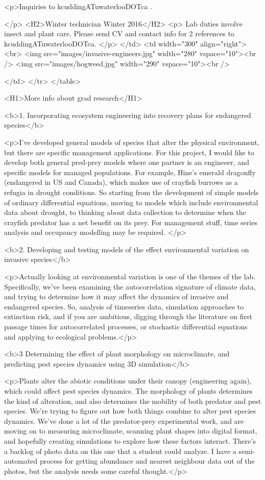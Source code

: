 <p>Inquiries to kcuddingATuwaterlooDOTca . 

  </p>
  <H2>Winter technician Winter 2016</H2> 
<p>
 Lab duties involve insect and plant care. Please send CV and contact info for 2 references to kcuddingATuwaterlooDOTca.  </p>
    </td>
    <td width="300" align="right">
<br>
	<img src="images/invasive-engineers.jpg" width="280" vspace="10"><br />
	<img src="images/hogweed.jpg" width="290" vspace="10"><br />
	
	</td>
  </tr>
</table>

<H1>More info about grad research</H1>



<b>1. Incorporating ecosystem engineering into recovery plans for endangered species</b>

<p>I've developed general models of species that alter the physical environment, but there are specific management applications. For this project, I would like to develop both general pred-prey models where one partner is an engineeer, and specific models for managed populations. For example, Hine's emerald dragonfly (endangered in US and Canada), which makes use of crayfish burrows as a refugia in drought conditions. So starting from the development of simple models of ordinary differential equations, moving to models which include environmental data about drought, to thinking about data collection to determine when the crayfish predator has a net benefit on its prey. For management stuff, time series analysis and occupancy modelling may be required. </p>

<b>2. Developing and testing models of the effect environmental variation on invasive species</b>

<p>Actually looking at environmental variation is one of the themes of the lab. Specifically, we've been examining the autocorrelation signature of climate data, and trying to determine how it may affect the dynamics of invasive and endangered species. So, analysis of timeseries data, simulation approaches to extinction risk, and if you are ambitious, digging through the literature on first passage times for autocorrelated processes, or stochastic differential equations and applying to ecological problems.</p>

<b>3 Determining the effect of plant morphology on microclimate, and predicting pest species dynamics using 3D simulation</b>

<p>Plants alter the abiotic conditions under their canopy (engineering again), which could affect pest species dynamics. The morphology of plants determines the kind of alteration, and also determines the mobility of both predator and pest species. We're trying to figure out how both things combine to alter pest species dynamics. We've done a lot of the predator-prey experimental work, and are moving on to measuring microclimate, scanning plant shapes into digital format, and hopefully creating simulations to explore how these factors interact. There's a backlog of photo data on this one that a student could analyze. I have a semi-automated process for getting abundance and nearest neighbour data out of the photos, but the analysis needs some careful thought.</p>

